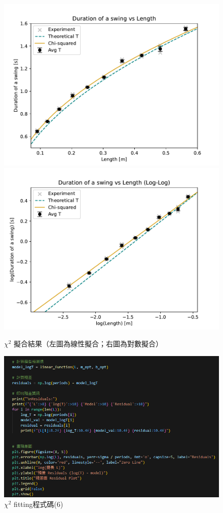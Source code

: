 \documentclass[12pt,a4paper]{article}
\begin{document}
\begin{CJK}{UTF8}{bkai}
\begin{figure}[h]
    \centering
    \includegraphics[width=0.45\linewidth]{chisq.pdf}    \includegraphics[width=0.45\linewidth]{chisq_log.pdf}
    \caption{$\chi^2$ 擬合結果（左圖為線性擬合；右圖為對數擬合）}
    \label{fig:chi_sq}
\end{figure}

\clearpage

\begin{figure}[h]
    \centering
    \includegraphics[width=1\linewidth]{chi6.png}
    \caption{$\chi^2$ fitting程式碼(6)}
    \label{fig:chi6}
\end{figure}


\end{CJK}
\end{document}
